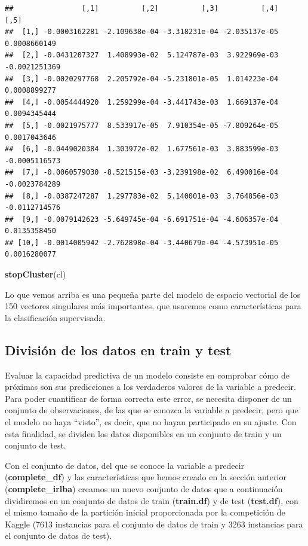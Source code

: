 \documentclass[]{article}
\newenvironment{Shaded}{\begin{snugshade}}{\end{snugshade}}
\newcommand{\KeywordTok}[1]{\textcolor[rgb]{0.13,0.29,0.53}{\textbf{#1}}}
\newcommand{\NormalTok}[1]{#1}
\begin{document}
\begin{verbatim}
##                [,1]          [,2]          [,3]          [,4]          [,5]
##  [1,] -0.0003162281 -2.109638e-04 -3.318231e-04 -2.035137e-05  0.0008660149
##  [2,] -0.0431207327  1.408993e-02  5.124787e-03  3.922969e-03 -0.0021251369
##  [3,] -0.0020297768  2.205792e-04 -5.231801e-05  1.014223e-04  0.0008899277
##  [4,] -0.0054444920  1.259299e-04 -3.441743e-03  1.669137e-04  0.0094345444
##  [5,] -0.0021975777  8.533917e-05  7.910354e-05 -7.809264e-05  0.0017043646
##  [6,] -0.0449020384  1.303972e-02  1.677561e-03  3.883599e-03 -0.0005116573
##  [7,] -0.0060579030 -8.521515e-03 -3.239198e-02  6.490016e-04 -0.0023784289
##  [8,] -0.0387247287  1.297783e-02  5.140001e-03  3.764856e-03 -0.0112714576
##  [9,] -0.0079142623 -5.649745e-04 -6.691751e-04 -4.606357e-04  0.0135358450
## [10,] -0.0014005942 -2.762898e-04 -3.440679e-04 -4.573951e-05  0.0016280077
\end{verbatim}

\begin{Shaded}
\begin{Highlighting}[]
\KeywordTok{stopCluster}\NormalTok{(cl)}
\end{Highlighting}
\end{Shaded}

Lo que vemos arriba es una pequeña parte del modelo de espacio vectorial
de los 150 vectores singulares más importantes, que usaremos como
características para la clasificación supervisada.

\hypertarget{divisiuxf3n-de-los-datos-en-train-y-test}{%
\subsection{División de los datos en train y
test}\label{divisiuxf3n-de-los-datos-en-train-y-test}}

Evaluar la capacidad predictiva de un modelo consiste en comprobar cómo
de próximas son sus predicciones a los verdaderos valores de la variable
a predecir. Para poder cuantificar de forma correcta este error, se
necesita disponer de un conjunto de observaciones, de las que se conozca
la variable a predecir, pero que el modelo no haya ``visto'', es decir,
que no hayan participado en su ajuste. Con esta finalidad, se dividen
los datos disponibles en un conjunto de train y un conjunto de test.

Con el conjunto de datos, del que se conoce la variable a predecir
(\textbf{complete\_df}) y las características que hemos creado en la
sección anterior (\textbf{complete\_irlba}) creamos un nuevo conjunto de
datos que a continuación dividiremos en un conjunto de datos de train
(\textbf{train.df}) y de test (\textbf{test.df}), con el mismo tamaño de
la partición inicial proporcionada por la competición de Kaggle (7613
instancias para el conjunto de datos de train y 3263 instancias para el
conjunto de datos de test).
\end{document}
